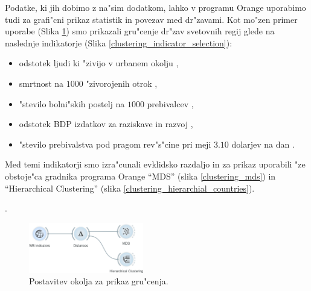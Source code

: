 Podatke, ki jih dobimo z na"sim dodatkom, lahko v programu Orange uporabimo tudi
za grafi"cni prikaz statistik in povezav med dr"zavami. Kot mo"zen primer
uporabe (Slika \ref{clustering_setup}) smo prikazali gru"cenje dr"zav svetovnih regij glede na naslednje
indikatorje (Slika \ref{clustering_indicator_selection}):
\begin{itemize}
  \item odstotek ljudi ki "zivijo v urbanem okolju 
    ,
  \item smrtnost na $1000$ "zivorojenih otrok
    ,
  \item "stevilo bolni"skih postelj na $1000$ prebivalcev
    ,
  \item odstotek BDP izdatkov za raziskave in razvoj
    ,
  \item "stevilo prebivalstva pod pragom rev"s"cine pri meji $3.10$ dolarjev na dan
    .
\end{itemize}
Med temi indikatorji smo izra"cunali evklidsko razdaljo in za prikaz 
uporabili "ze obstoje"ca gradnika programa Orange
``MDS'' (slika \ref{clustering_mds}) in
``Hierarchical Clustering'' (slika \ref{clustering_hierarchial_countries}).



. 


\begin{figure}
\begin{center}
\includegraphics[width=5cm]{pic/clustering_setup.png}
\end{center}
\caption{Postavitev okolja za prikaz gru"cenja.}
\label{clustering_setup}
\end{figure} 

